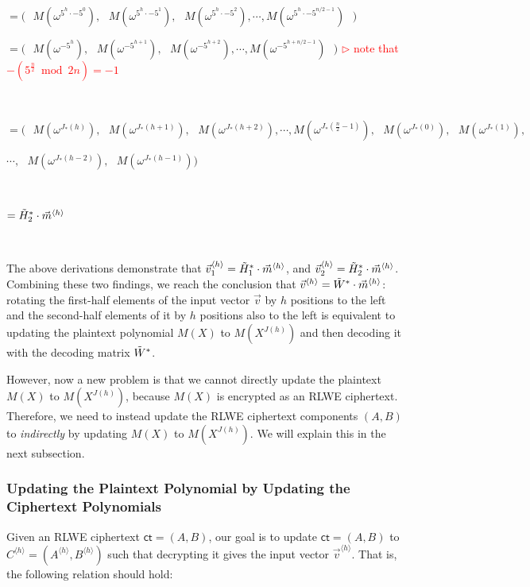 $= \bm{(} \text{ } M(\omega^{5^h\cdot -5^0}), \text{ } M(\omega^{5^h\cdot -5^1}), \text{ } M(\omega^{5^h\cdot -5^2}), \cdots, M(\omega^{5^h\cdot -5^{n/2-1}}) \text{ } \bm{)}$

$= \bm{(} \text{ } M(\omega^{-5^{h}}), \text{ } M(\omega^{-5^{h+1}}), \text{ } M(\omega^{-5^{h+2}}), \cdots, M(\omega^{-5^{h+n/2-1}}) \text{ } \bm{)}$ \textcolor{red}{ $\rhd$ note that $-(5^{\frac{n}{2}} \bmod 2n) = -1$}

$ $

$= \bm{(} \text{ } M(\omega^{J_*(h)}), \text{ } M(\omega^{J_*(h+1)}), \text{ } M(\omega^{J_*(h+2)}), \cdots, M(\omega^{J_*(\frac{n}{2}-1)}), \text{ } M(\omega^{J_*(0)}), \text{ }M(\omega^{J_*(1)}),$ 
                                    
$\cdots, \text{ } M(\omega^{J_*(h-2)}), \text{ } M(\omega^{J_*(h-1)})  \bm{)}$ 

$ $

$= \tilde{H}_2^{*}\cdot \vec{m}^{\langle h \rangle}$


$ $

The above derivations demonstrate that $\vec{v}_1^{\langle h \rangle} = \tilde{H}_1^{*}\cdot \vec{m}^{\langle h \rangle}$, and $\vec{v}_2^{\langle h \rangle} = \tilde{H}_2^{*}\cdot \vec{m}^{\langle h \rangle}$. Combining these two findings, we reach the conclusion that $\vec{v}^{\langle h \rangle} = \tilde{W}^* \cdot \vec{m}^{\langle h \rangle}$: rotating the first-half elements of the input vector $\vec{v}$ by $h$ positions to the left and the second-half elements of it by $h$ positions also to the left is equivalent to updating the plaintext polynomial $M(X)$ to $M(X^{J(h)})$ and then decoding it with the decoding matrix $\tilde{W}^*$. 



However, now a new problem is that we cannot directly update the plaintext $M(X)$ to $M(X^{J(h)})$, because $M(X)$ is encrypted as an RLWE ciphertext. Therefore, we need to instead update the RLWE ciphertext components $(A, B)$ to \textit{indirectly} by updating $M(X)$ to $M(X^{J(h)})$. We will explain this in the next subsection.


\subsubsection{Updating the Plaintext Polynomial by Updating the Ciphertext Polynomials}

Given an RLWE ciphertext $\textsf{ct} = (A, B)$, our goal is to update $\textsf{ct} = (A, B)$ to $C^{\langle h \rangle} = (A^{\langle h \rangle}, B^{\langle h \rangle})$ such that decrypting it gives the input vector $\vec{v}^{\langle h \rangle}$. That is, the following relation should hold: 

